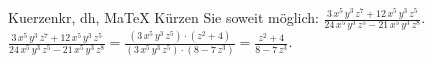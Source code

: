 \begin{MAufgabe}{Kuerzen}{kr, dh, MaTeX}
K\"urzen Sie soweit m\"oglich: $\frac{3\, x^5\, y^3\, z^7 + 12\, x^5\, y^3\, z^5}{24\, x^5\, y^3\, z^5 - 21\, x^5\, y^3\, z^8}$.\\ 
\ifLsg\MLoesung
\quad $\frac{3\, x^5\, y^3\, z^7 + 12\, x^5\, y^3\, z^5}{24\, x^5\, y^3\, z^5 - 21\, x^5\, y^3\, z^8}=\frac{(3\, x^5\, y^3\, z^5)\cdot(z^2 + 4)}{(3\, x^5\, y^3\, z^5)\cdot(8 - 7\, z^3)}=\frac{z^2 + 4}{8 - 7\, z^3}$.\else\relax\fi
 \end{MAufgabe}